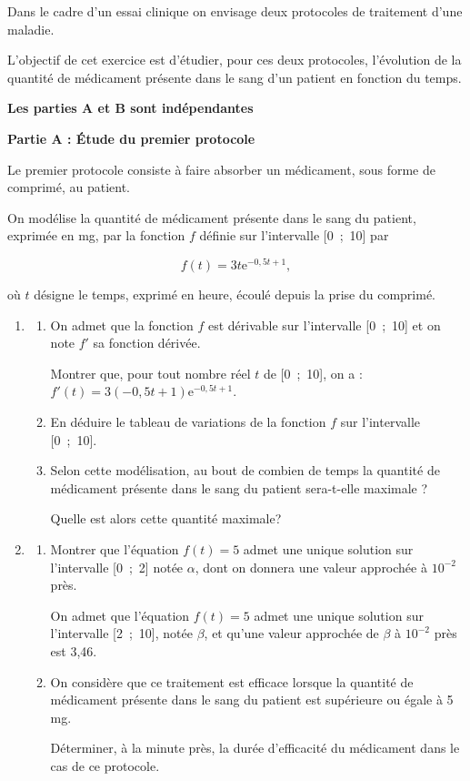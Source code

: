 \medskip

Dans le cadre d'un essai clinique on envisage deux protocoles de traitement 
d'une maladie.

L'objectif de cet exercice est d'étudier, pour ces deux protocoles, l'évolution de la quantité de médicament présente dans le sang d'un patient en fonction du temps.

\medskip

\textbf{Les parties A et B sont indépendantes}

\medskip

\textbf{Partie A : Étude du premier protocole}

\medskip

Le premier protocole consiste à faire absorber un médicament, sous forme de comprimé, au patient.

On modélise la quantité de médicament présente dans le sang du patient, exprimée en mg, par la fonction $f$ définie sur l'intervalle [0~;~10] par 

\[f(t) = 3t\text{e}^{-0,5t+1},\]

où $t$ désigne le temps, exprimé en heure, écoulé depuis la prise du comprimé.

\medskip

\begin{enumerate}
\item 
	\begin{enumerate}
		\item On admet que la fonction $f$ est dérivable sur l'intervalle [0~;~10] et on note $f'$ sa fonction dérivée.
		
Montrer que, pour tout nombre réel $t$ de [0~;~10], on a : $f'(t) = 3(- 0,5t + 1)\text{e}^{-0,5t+1}$.
		\item En déduire le tableau de variations de la fonction $f$ sur l'intervalle [0~;~10].
		\item Selon cette modélisation, au bout de combien de temps la quantité de médicament présente dans le sang du patient sera-t-elle maximale ?
		
Quelle est alors cette quantité maximale?
	\end{enumerate}
\item 
	\begin{enumerate}
		\item Montrer que l'équation $f(t) = 5$ admet une unique solution sur l'intervalle [0~;~2] notée $\alpha$, dont on donnera une valeur approchée à $10^{-2}$ près.
		
On admet que l'équation $f(t) = 5$ admet une unique solution sur l'intervalle [2~;~10], notée $\beta$, et qu'une valeur approchée de $\beta$ à $10^{-2}$ près est 3,46.
		\item On considère que ce traitement est efficace lorsque la quantité de médicament présente dans le sang du patient est supérieure ou égale à 5 mg.
		
Déterminer, à la minute près, la durée d'efficacité du médicament dans le cas de ce protocole.
	\end{enumerate}
\end{enumerate}

